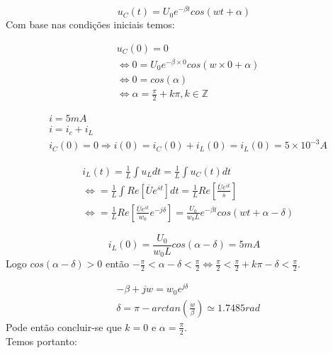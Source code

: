 \begin{equation}
  u_C(t) = U_0 e^{-\beta t} cos(wt + \alpha)
\end{equation}
Com base nas condições iniciais temos:

\begin{equation}
  \begin{aligned}
    &u_C(0) = 0 \\
    &\Leftrightarrow  0 = U_0 e^{-\beta \times 0} cos(w \times 0 + \alpha) \\
    &\Leftrightarrow 0 = cos(\alpha) \\
    &\Leftrightarrow \alpha = \frac{\pi}{2} + k \pi, k \in \mathbb{Z}
  \end{aligned}
\end{equation}

\begin{equation}
  \begin{aligned}
    &i = 5 mA\\
    &i = i_c + i_L\\
    &i_C(0) = 0 \Rightarrow i (0) = i_C(0) + i_L(0) = i_L(0) = 5 \times 10^{-3} A
  \end{aligned}
\end{equation}

\begin{equation}
  \begin{aligned}
    &i_L(t) = \frac{1}{L} \int u_L dt = \frac{1}{L} \int u_C(t) dt \\
    & \Leftrightarrow  = \frac{1}{L} \int Re[\overline{U} e^{\overline{s} t}] dt = \frac{1}{L} Re [{\frac{\overline{U} e^{\overline{s}t}}{\overline{s}}}]\\
    & \Leftrightarrow = \frac{1}{L} Re [\frac{\overline{U} e^{\overline{s}t}}{w_0} e^{-j \delta}] = \frac{U_0}{w_0L} e^{-\beta t} cos(wt + \alpha - \delta)
  \end{aligned}
\end{equation}

\begin{equation}
  i_L(0) = \frac{U_0}{w_0 L} cos(\alpha - \delta) = 5 mA
\end{equation}
Logo $cos(\alpha - \delta) > 0$ então $-\frac{\pi}{2} < \alpha - \delta < \frac{\pi}{2} \Leftrightarrow \frac{\pi}{2} < \frac{\pi}{2} + k\pi - \delta < \frac{\pi}{2}$.

\begin{equation}
  \begin{aligned}
    &-\beta + jw = w_0 e^{j \delta}\\
    &\delta = \pi - arctan(\frac{w}{\beta}) \simeq 1.7485 rad
  \end{aligned}
\end{equation}
Pode então concluir-se que $k = 0$ e $\alpha = \frac{\pi}{2}$.
\\Temos portanto:

